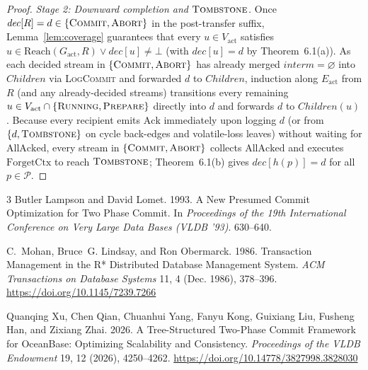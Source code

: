 \documentclass[sigconf,nonacm]{acmart}
\newcommand{\stRun}{\textsc{Running}}
\newcommand{\stPrep}{\textsc{Prepare}}
\newcommand{\stCom}{\textsc{Commit}}
\newcommand{\stAbt}{\textsc{Abort}}
\newcommand{\stTomb}{\textsc{Tombstone}}
\newcommand{\Children}{\mathit{Children}}
\newcommand{\interm}{\mathit{interm}}
\newcommand{\dec}{\mathit{dec}}
\begin{document}
\begin{proof}
\balance
\emph{Stage 2: Downward completion and \(\stTomb\).} Once \(\dec[R] = d \in
\{\stCom,\allowbreak \stAbt\}\) in the post-transfer suffix,
Lemma~\ref{lem:coverage} guarantees that every \(u \in V_{\mathrm{act}}\)
satisfies \(u \in \mathrm{Reach}(G_{\mathrm{act}}, R) \lor \dec[u] \neq
\bot\) (with \(\dec[u] = d\) by Theorem~6.1(a)). As each decided stream in
\(\{\stCom,\allowbreak \stAbt\}\) has already merged \(\interm =
\varnothing\) into \(\Children\) via \textsc{LogCommit} and forwarded \(d\)
to \(\Children\), induction along \(E_{\mathrm{act}}\) from \(R\) (and any
already-decided streams) transitions every remaining \(u \in V_{\mathrm{act}}
\cap \{\stRun,\allowbreak \stPrep\}\) directly into \(d\) and forwards \(d\)
to \(\Children(u)\). Because every recipient emits \(\mathrm{Ack}\)
immediately upon logging \(d\) (or from \(\{d,\allowbreak \stTomb\}\) on
cycle back-edges and volatile-loss leaves) without waiting for
\(\mathrm{AllAcked}\), every stream in \(\{\stCom,\allowbreak \stAbt\}\)
collects \(\mathrm{AllAcked}\) and executes \(\mathrm{ForgetCtx}\) to reach
\(\stTomb\); Theorem~6.1(b) gives \(\dec[h(p)] = d\) for all \(p \in
\mathcal{P}\).
\end{proof}

\begin{thebibliography}{3}
Butler Lampson and David Lomet. 1993.
\newblock A New Presumed Commit Optimization for Two Phase Commit.
\newblock In \emph{Proceedings of the 19th International Conference on Very
  Large Data Bases (VLDB '93)}. 630--640.

C.~Mohan, Bruce~G. Lindsay, and Ron Obermarck. 1986.
\newblock Transaction Management in the {R*} Distributed Database Management
  System.
\newblock \emph{ACM Transactions on Database Systems} 11, 4 (Dec. 1986),
  378--396.
\newblock \url{https://doi.org/10.1145/7239.7266}

Quanqing Xu, Chen Qian, Chuanhui Yang, Fanyu Kong, Guixiang Liu, Fusheng
Han, and Zixiang Zhai. 2026.
\newblock A Tree-Structured Two-Phase Commit Framework for {OceanBase}:
  Optimizing Scalability and Consistency.
\newblock \emph{Proceedings of the VLDB Endowment} 19, 12 (2026),
  4250--4262.
\newblock \url{https://doi.org/10.14778/3827998.3828030}
\end{thebibliography}
\end{document}
